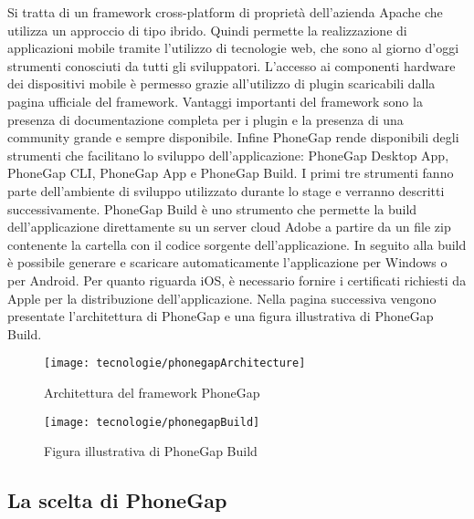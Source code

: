 Si tratta di un framework cross-platform di proprietà dell'azienda Apache che utilizza un approccio di tipo ibrido. Quindi permette la realizzazione di applicazioni mobile tramite l'utilizzo di tecnologie web, che sono al giorno d'oggi strumenti conosciuti da tutti gli sviluppatori. L'accesso ai componenti hardware dei dispositivi mobile è permesso grazie all'utilizzo di plugin scaricabili dalla pagina ufficiale del framework. Vantaggi importanti del framework sono la presenza di documentazione completa per i plugin e la presenza di una community grande e sempre disponibile. Infine PhoneGap rende disponibili degli strumenti che facilitano lo sviluppo dell'applicazione: PhoneGap Desktop App, PhoneGap CLI, PhoneGap App e PhoneGap Build. I primi tre strumenti fanno parte dell'ambiente di sviluppo utilizzato durante lo stage e verranno descritti successivamente. PhoneGap Build è uno strumento che permette la build dell'applicazione direttamente su un server cloud Adobe a partire da un file zip contenente la cartella con il codice sorgente dell'applicazione. In seguito alla build è possibile generare e scaricare automaticamente l'applicazione per Windows o per Android. Per quanto riguarda iOS, è necessario fornire i certificati richiesti da Apple per la distribuzione dell'applicazione. Nella pagina successiva vengono presentate l'architettura di PhoneGap e una figura illustrativa di PhoneGap Build.

\begin{figure}[!h] 
    \centering 
    \texttt{[image: tecnologie/phonegapArchitecture]} 
    \caption{Architettura del framework PhoneGap}
\end{figure}

\begin{figure}[!h] 
    \centering 
    \texttt{[image: tecnologie/phonegapBuild]} 
    \caption{Figura illustrativa di PhoneGap Build}
\end{figure}

\newpage


\subsection{La scelta di PhoneGap}

